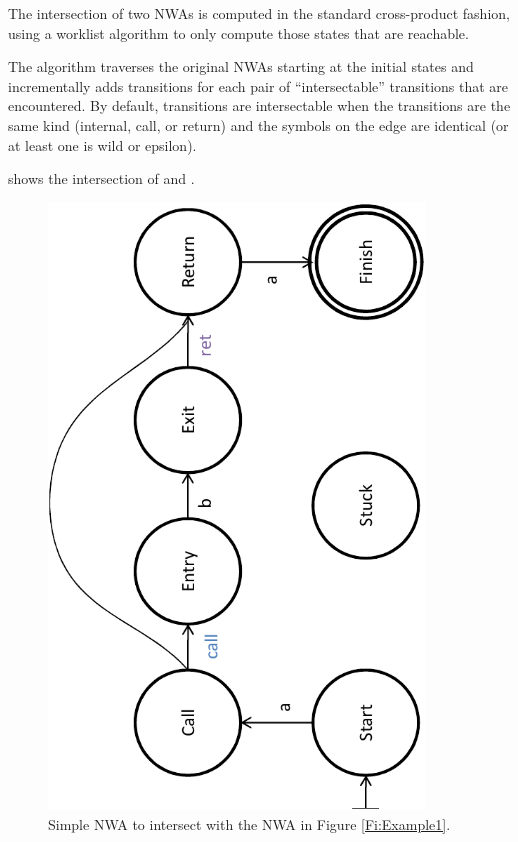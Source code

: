 The intersection of two NWAs is computed in the standard cross-product
fashion, using a worklist algorithm to only compute those states that
are reachable.

The algorithm traverses the original NWAs starting at
the initial states and incrementally adds transitions for each pair of
``intersectable'' transitions that are encountered. By default, transitions
are intersectable when the transitions are the same kind (internal, call,
or return) and the symbols on the edge are identical (or at least one is wild
or epsilon).

 shows the intersection of  and
.
 
\begin{figure}[htbp]
  \centering
    \includegraphics[width=10cm]{Figures/Figure5}
  \caption{Simple NWA to intersect with the NWA in Figure \ref{Fi:Example1}.}
  \label{Fi:Intersect1}
\end{figure}

